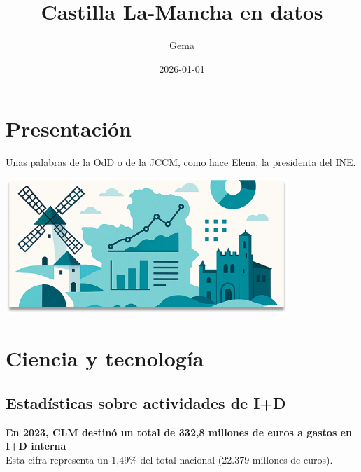 \documentclass[
  10pt,
  a4paper,
  DIV=11,
  numbers=noendperiod]{scrreprt}
\title{Castilla La-Mancha en datos}
\author{Gema}
\date{2026-01-01}
\renewcommand*\contentsname{Tabla de contenidos}
\newcommand\contentsname{Tabla de contenidos}
\begin{document}
\maketitle
\ifdefined\Shaded\renewenvironment{Shaded}{\begin{tcolorbox}[sharp corners, breakable, enhanced, boxrule=0pt, borderline west={3pt}{0pt}{shadecolor}, interior hidden, frame hidden]}{\end{tcolorbox}}\fi

\renewcommand*\contentsname{Tabla de contenidos}
{
\hypersetup{linkcolor=}
\setcounter{tocdepth}{2}
\tableofcontents
}

\hypertarget{presentaciuxf3n}{%
\chapter*{Presentación}\label{presentaciuxf3n}}


Unas palabras de la OdD o de la JCCM, como hace Elena, la presidenta del
INE.

\includegraphics[width=0.8\textwidth,height=\textheight]{cover_ejemplo.png}


\hypertarget{ciencia-y-tecnologuxeda}{%
\chapter{Ciencia y tecnología}\label{ciencia-y-tecnologuxeda}}

\hypertarget{estaduxedsticas-sobre-actividades-de-id}{%
\section{Estadísticas sobre actividades de
I+D}\label{estaduxedsticas-sobre-actividades-de-id}}

{\textbf{En 2023, CLM destinó un total de 332,8 millones de euros a
gastos en I+D interna}}\\
Esta cifra representa un 1,49\% del total nacional (22.379 millones de
euros).
\end{document}
